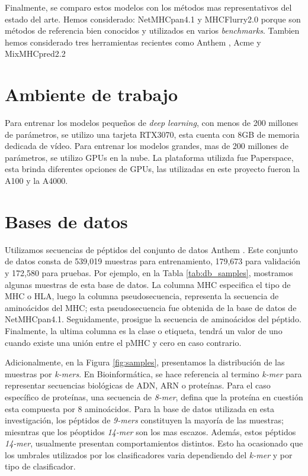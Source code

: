 Finalmente, se comparo estos modelos con los métodos mas representativos del estado del arte. Hemos considerado:  NetMHCpan4.1 \citep{reynisson2020netmhcpan} y MHCFlurry2.0 \citep{o2020mhcflurry} porque son métodos de referencia bien conocidos y utilizados en varios \textit{benchmarks}. Tambien  hemos considerado tres herramientas recientes como Anthem \citep{mei2021anthem}, Acme \citep{hu2019acme} y MixMHCpred2.2 \citep{gfeller2023improved}


\section{Ambiente de trabajo}

Para entrenar los modelos pequeños de \textit{deep learning}, con menos de 200 millones de parámetros, se utilizo una tarjeta RTX3070, esta cuenta con 8GB de memoria dedicada de vídeo. Para entrenar los modelos grandes, mas de 200 millones de parámetros, se utilizo GPUs en la nube. La plataforma utilizda fue Paperspace, esta brinda diferentes opciones de GPUs, las utilizadas en este proyecto fueron la A100 y la A4000.

\section{Bases de datos}
Utilizamos secuencias de péptidos del conjunto de datos Anthem \citep{mei2021anthem}. Este conjunto de datos consta de 539,019 muestras para entrenamiento, 179,673 para validación y 172,580 para pruebas. Por ejemplo, en la Tabla \ref{tab:db_samples}, mostramos algunas muestras de esta base de datos. La columna MHC especifica el tipo de MHC o HLA, luego la columna pseudosecuencia, representa la secuencia de aminoácidos del MHC; esta pseudosecuencia fue obtenida de la base de datos de NetMHCpan4.1. Seguidamente, prosigue la secuencia de aminoácidos del péptido. Finalmente, la ultima columna es la clase o etiqueta, tendrá un valor de uno cuando existe una unión entre el pMHC y cero en caso contrario.


Adicionalmente, en la Figura \ref{fig:samples}, presentamos la distribución de las muestras por \textit{k-mers}. En Bioinformática, se hace referencia al termino \textit{k-mer} para representar secuencias biológicas de ADN, ARN o proteínas. Para el caso específico de proteínas, una secuencia de \textit{8-mer}, defina que la proteína en cuestión esta compuesta por 8 aminoácidos. Para la base de datos utilizada en esta investigación, los péptidos de \textit{9-mers} constituyen la mayoría de las muestras; miesntras que los péoptidos \textit{14-mer} son los mas escazos. Además, estos péptidos \textit{14-mer}, usualmente presentan comportamientos distintos. Esto ha ocasionado que los umbrales utilizados por los clasificadores varia dependiendo del \textit{k-mer} y por tipo de clasificador. 

